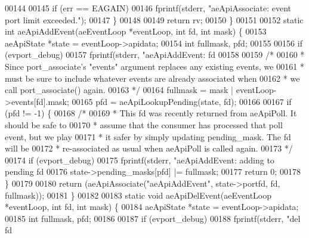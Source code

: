 \begin{DoxyCode}
{{{00144 
00145         \textcolor{keywordflow}{if} (err == EAGAIN)
00146             fprintf(stderr, \textcolor{stringliteral}{"aeApiAssociate: event port limit exceeded."});
00147     \}
00148 
00149     \textcolor{keywordflow}{return} rv;
00150 \}
00151 
00152 \textcolor{keyword}{static} \textcolor{keywordtype}{int} aeApiAddEvent(aeEventLoop *eventLoop, \textcolor{keywordtype}{int} fd, \textcolor{keywordtype}{int} mask) \{
00153     aeApiState *state = eventLoop->apidata;
00154     \textcolor{keywordtype}{int} fullmask, pfd;
00155 
00156     \textcolor{keywordflow}{if} (evport\_debug)
00157         fprintf(stderr, \textcolor{stringliteral}{"aeApiAddEvent: fd %
00158 
00159     \textcolor{comment}{/*}
00160 \textcolor{comment}{     * Since port\_associate's "events" argument replaces any existing events, we}
00161 \textcolor{comment}{     * must be sure to include whatever events are already associated when}
00162 \textcolor{comment}{     * we call port\_associate() again.}
00163 \textcolor{comment}{     */}
00164     fullmask = mask | eventLoop->events[fd].mask;
00165     pfd = aeApiLookupPending(state, fd);
00166 
00167     \textcolor{keywordflow}{if} (pfd != -1) \{
00168         \textcolor{comment}{/*}
00169 \textcolor{comment}{         * This fd was recently returned from aeApiPoll.  It should be safe to}
00170 \textcolor{comment}{         * assume that the consumer has processed that poll event, but we play}
00171 \textcolor{comment}{         * it safer by simply updating pending\_mask.  The fd will be}
00172 \textcolor{comment}{         * re-associated as usual when aeApiPoll is called again.}
00173 \textcolor{comment}{         */}
00174         \textcolor{keywordflow}{if} (evport\_debug)
00175             fprintf(stderr, \textcolor{stringliteral}{"aeApiAddEvent: adding to pending fd %
00176         state->pending\_masks[pfd] |= fullmask;
00177         \textcolor{keywordflow}{return} 0;
00178     \}
00179 
00180     \textcolor{keywordflow}{return} (aeApiAssociate(\textcolor{stringliteral}{"aeApiAddEvent"}, state->portfd, fd, fullmask));
00181 \}
00182 
00183 \textcolor{keyword}{static} \textcolor{keywordtype}{void} aeApiDelEvent(aeEventLoop *eventLoop, \textcolor{keywordtype}{int} fd, \textcolor{keywordtype}{int} mask) \{
00184     aeApiState *state = eventLoop->apidata;
00185     \textcolor{keywordtype}{int} fullmask, pfd;
00186 
00187     \textcolor{keywordflow}{if} (evport\_debug)
00188         fprintf(stderr, \textcolor{stringliteral}{"del fd %
}}}}}}
\end{DoxyCode}
